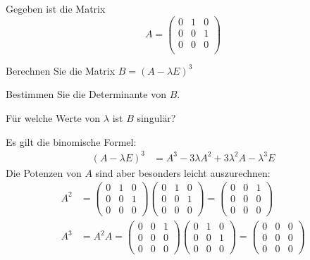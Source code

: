 Gegeben ist die Matrix
\[
A=\begin{pmatrix}
0&1&0\\
0&0&1\\
0&0&0\\
\end{pmatrix}
\]
\begin{teilaufgaben}
\item Berechnen Sie die Matrix $B=(A-\lambda E)^3$
\item Bestimmen Sie die Determinante von $B$.
\item Für welche Werte von $\lambda$ ist $B$ singulär?
\end{teilaufgaben}


\begin{loesung}
\begin{teilaufgaben}
\item Es gilt die binomische Formel:
\begin{align*}
(A-\lambda E)^3&=A^3-3\lambda A^2+3\lambda^2 A-\lambda^3 E
\end{align*}
Die Potenzen von $A$ sind aber besonders leicht auszurechnen:
\begin{align*}
A^2&=
\begin{pmatrix}
0&1&0\\
0&0&1\\
0&0&0
\end{pmatrix}
\begin{pmatrix}
0&1&0\\
0&0&1\\
0&0&0
\end{pmatrix}
=
\begin{pmatrix}
0&0&1\\
0&0&0\\
0&0&0
\end{pmatrix}
\\
A^3&=A^2A=
\begin{pmatrix}
0&0&1\\
0&0&0\\
0&0&0
\end{pmatrix}
\begin{pmatrix}
0&1&0\\
0&0&1\\
0&0&0
\end{pmatrix}
=\begin{pmatrix}
0&0&0\\
0&0&0\\
0&0&0
\end{pmatrix}

\end{align*}
\end{teilaufgaben}
\end{loesung}
